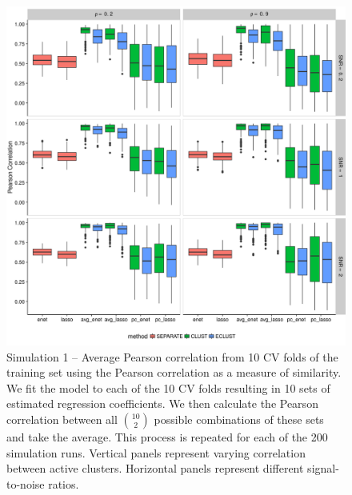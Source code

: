 \begin{appendices}
\begin{figure}[H]
	\centering
	\includegraphics[scale=0.6, keepaspectratio]{./figs/hydra/results/figures/sim1-sept10/pearson_Correlation_sim1.png}
	\caption{Simulation 1 -- Average Pearson correlation from 10 CV folds of the training set using the Pearson correlation as a measure of similarity. We fit the model to each of the 10 CV folds resulting in 10 sets of estimated regression coefficients. We then calculate the Pearson correlation between all $\binom{10}{2}$ possible combinations of these sets and take the average. This process is repeated for each of the 200 simulation runs. Vertical panels represent varying correlation between active clusters. Horizontal panels represent different signal-to-noise ratios.}
	\label{fig:pearson_Correlation_sim1}
\end{figure}


\end{appendices}
